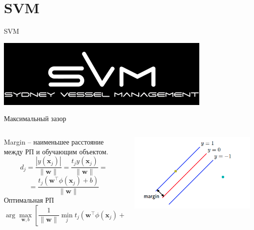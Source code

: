 \documentclass[aspectratio=169]{beamer}
\begin{document}

\section{SVM}


\begin{frame}{}

\begin{center}
\Large SVM

\vspace{1em}
\includegraphics[scale=0.5]{images/svm_logo.jpg}
\end{center}

\end{frame}

\begin{frame}{Максимальный зазор}

\begin{columns}[T]
    \begin{column}{.51\textwidth}
    Margin -- наименьшее расстояние между РП и обучающим объектом.
    \[
    d_j = \frac{|y(\mathbf{x}_j)|}{\|\mathbf{w}\|} = \frac{t_j y(\mathbf{x}_j)}{\|\mathbf{w}\|} = 
    \]    
    \[
    = \frac{t_j (\mathbf{w}^\top \phi(\mathbf{x}_j) + b)}{\|\mathbf{w}\|}
    \]
    Оптимальная РП
    \[
    \arg \max_{\mathbf{w}, b} \left[\frac{1}{\|\mathbf{w}\|} \min_j t_j (\mathbf{w}^\top \phi(\mathbf{x}_j) + b) \right]
    \]
	
    \end{column}
       
    \begin{column}{.5\textwidth}
    \vspace{-0em}
	\begin{center}
   		\includegraphics[scale=0.45]{images/margin.png}
    \end{center}
    \end{column}
  \end{columns}
  
\end{frame}
\end{document}
